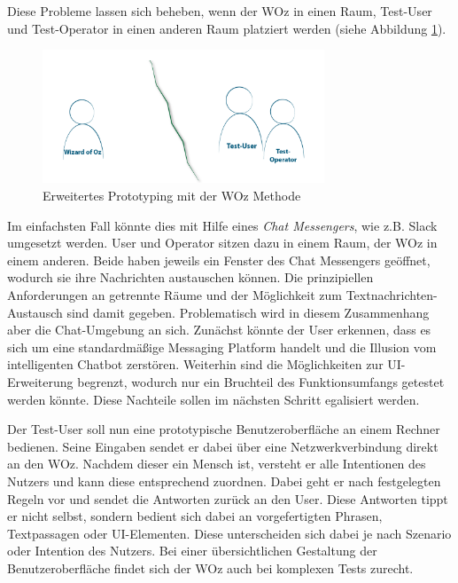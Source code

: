 Diese Probleme lassen sich beheben, wenn der \acl{WOz} in einen Raum, Test-User und Test-Operator in einen anderen Raum platziert werden (siehe Abbildung \ref{fig:wizard-of-oz-v2}).
\newline

\begin{figure}[htb]
    \centering
    \includegraphics[width=0.75\textwidth]{bilder/WizardOfOz_v2.png}
    \caption{Erweitertes Prototyping mit der \acl{WOz} Methode}
    \label{fig:wizard-of-oz-v2}
\end{figure}

Im einfachsten Fall könnte dies mit Hilfe eines \textit{Chat Messengers}, wie z.B. Slack umgesetzt werden. User und Operator sitzen dazu in einem Raum, der \ac{WOz} in einem anderen. Beide haben jeweils ein Fenster des Chat Messengers geöffnet, wodurch sie ihre Nachrichten austauschen können. Die prinzipiellen Anforderungen an getrennte Räume und der Möglichkeit zum Textnachrichten-Austausch sind damit gegeben. Problematisch wird in diesem Zusammenhang aber die Chat-Umgebung an sich. Zunächst könnte der User erkennen, dass es sich um eine standardmäßige Messaging Platform handelt und die Illusion vom intelligenten Chatbot zerstören. Weiterhin sind die Möglichkeiten zur \ac{UI}-Erweiterung begrenzt, wodurch nur ein Bruchteil des Funktionsumfangs getestet werden könnte. Diese Nachteile sollen im nächsten Schritt egalisiert werden.  

Der Test-User soll nun eine prototypische Benutzeroberfläche an einem Rechner bedienen. Seine Eingaben sendet er dabei über eine Netzwerkverbindung direkt an den \ac{WOz}. Nachdem dieser ein Mensch ist, versteht er alle Intentionen des Nutzers und kann diese entsprechend zuordnen. Dabei geht er nach festgelegten Regeln vor und sendet die Antworten zurück an den User. Diese Antworten tippt er nicht selbst, sondern bedient sich dabei an vorgefertigten Phrasen, Textpassagen oder \ac{UI}-Elementen. Diese unterscheiden sich dabei je nach Szenario oder Intention des Nutzers. Bei einer übersichtlichen Gestaltung der Benutzeroberfläche findet sich der \acl{WOz} auch bei komplexen Tests zurecht. 

